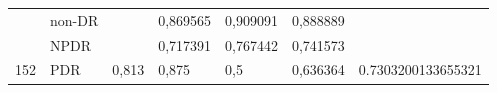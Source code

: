 \begin{table}[hbtp]
\begin{center}
\begin{tabular}{|c|l|c|l|l|l|c|}
                                  & non-DR                                             &                          & 0,869565                                          & 0,909091                                         & 0,888889                                        &                                      \\ \cline{2-2} \cline{4-6}
                                  & NPDR                                               &                          & 0,717391                                          & 0,767442                                         & 0,741573                                        &                                      \\ \cline{2-2} \cline{4-6}
            \multirow{-3}{*}{152} & PDR                                                & \multirow{-3}{*}{0,813}  & 0,875                                             & 0,5                                              & 0,636364                                        & \multirow{-3}{*}{0.7303200133655321} \\ \hline
            \end{tabular}
        \end{center}
    \end{table}
